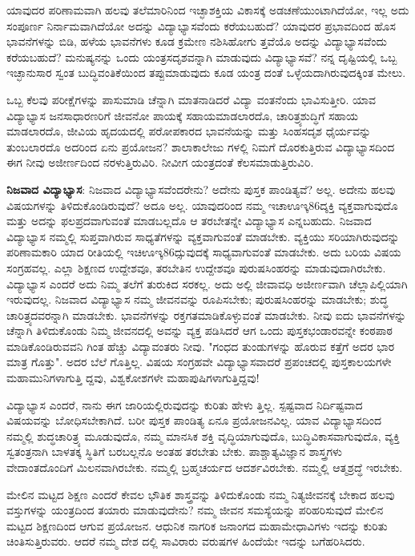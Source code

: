 ಯಾವುದರ ಪರಿಣಾಮವಾಗಿ ಹಲವು ತಲೆಮಾರಿನಿಂದ ಇಚ್ಛಾಶಕ್ತಿಯ ವಿಕಾಸಕ್ಕೆ ಅಡಚಣೆಯುಂಟಾಗಿದೆಯೋ, ಇಲ್ಲ ಅದು ಸಂಪೂರ್ಣ ನಿರ್ನಾಮವಾಗಿದೆಯೋ ಅದನ್ನು ವಿದ್ಯಾಭ್ಯಾಸವೆಂದು ಕರೆಯಬಹುದೆ? ಯಾವುದರ ಪ್ರಭಾವದಿಂದ ಹೊಸ ಭಾವನೆಗಳನ್ನು ಬಿಡಿ, ಹಳೆಯ ಭಾವನೆಗಳು ಕೂಡ ಕ್ರಮೇಣ ನಶಿಸಿಹೋಗು ತ್ತವೆಯೊ ಅದನ್ನು ವಿದ್ಯಾಭ್ಯಾಸವೆಂದು ಕರೆಯಬಹುದೆ? ಮನುಷ್ಯನನ್ನು ಒಂದು ಯಂತ್ರಸದೃಶವನ್ನಾಗಿ ಮಾಡುವುದು ವಿದ್ಯಾಭ್ಯಾಸವೆ? ನನ್ನ ದೃಷ್ಟಿಯಲ್ಲಿ ಒಬ್ಬ ಇಚ್ಛಾನುಸಾರ ಸ್ವಂತ ಬುದ್ಧಿವಂತಿಕೆಯಿಂದ ತಪ್ಪುಮಾಡುವುದು ಕೂಡ ಯಂತ್ರ ದಂತೆ ಒಳ್ಳೆಯದಾಗಿರುವುದಕ್ಕಿಂತ ಮೇಲು.

ಒಬ್ಬ ಕೆಲವು ಪರೀಕ್ಷೆಗಳನ್ನು ಪಾಸುಮಾಡಿ ಚೆನ್ನಾಗಿ ಮಾತನಾಡಿದರೆ ವಿದ್ಯಾ ವಂತನೆಂದು ಭಾವಿಸುತ್ತೀರಿ. ಯಾವ ವಿದ್ಯಾಭ್ಯಾಸ ಜನಸಾಧಾರಣರಿಗೆ ಜೀವನೋ ಪಾಯಕ್ಕೆ ಸಹಾಯಮಾಡಲಾರದೊ, ಚಾರಿತ್ರ್ಯಶುದ್ಧಿಗೆ ಸಹಾಯ ಮಾಡಲಾರದೊ, ಜೀವಿಯ ಹೃದಯದಲ್ಲಿ ಪರೋಪಕಾರದ ಭಾವನೆಯನ್ನು ಮತ್ತು ಸಿಂಹಸದೃಶ ಧೈರ್ಯವನ್ನು ತುಂಬಲಾರದೊ ಅದರಿಂದ ಏನು ಪ್ರಯೋಜನ? ಶಾಲಾಕಾಲೇಜು ಗಳಲ್ಲಿ ನಿಮಗೆ ದೊರಕುತ್ತಿರುವ ವಿದ್ಯಾಭ್ಯಾಸದಿಂದ ಈಗ ನೀವು ಅಜೀರ್ಣದಿಂದ ನರಳುತ್ತಿರುವಿರಿ. ನೀವೀಗ ಯಂತ್ರದಂತೆ ಕೆಲಸಮಾಡುತ್ತಿರುವಿರಿ.

\textbf{ನಿಜವಾದ ವಿದ್ಯಾಭ್ಯಾಸ}: ನಿಜವಾದ ವಿದ್ಯಾಭ್ಯಾಸವೆಂದರೇನು? ಅದೇನು ಪುಸ್ತಕ ಪಾಂಡಿತ್ಯವೆ? ಅಲ್ಲ. ಅದೇನು ಹಲವು ವಿಷಯಗಳನ್ನು ತಿಳಿದುಕೊಂಡಿರುವುದೆ? ಅದೂ ಅಲ್ಲ. ಯಾವುದರಿಂದ ನಮ್ಮ ಇಚಾಊಇ್ಕ86ದ್ಶಕ್ತಿ ವ್ಯಕ್ತವಾಗುವುದೊ ಮತ್ತು ಅದನ್ನು ಫಲಪ್ರದವಾಗುವಂತೆ ಮಾಡಬಲ್ಲದೊ ಆ ತರಬೇತನ್ನೇ ವಿದ್ಯಾಭ್ಯಾಸ ಎನ್ನಬಹುದು. ನಿಜವಾದ ವಿದ್ಯಾಭ್ಯಾಸ ನಮ್ಮಲ್ಲಿ ಸುಪ್ತವಾಗಿರುವ ಸಾಧ್ಯತೆಗಳನ್ನು ವ್ಯಕ್ತವಾಗುವಂತೆ ಮಾಡಬೇಕು. ವ್ಯಕ್ತಿಯು ಸರಿಯಾಗಿರುವುದನ್ನು ಪರಿಣಾಮಕಾರಿ ಯಾದ ರೀತಿಯಲ್ಲಿ ಇಚಿಊಇ್ಕ86ದ್ಸುವುದಕ್ಕೆ ಸಾಧ್ಯವಾಗುವಂತೆ ಮಾಡಬೇಕು. ಅದು ಬರಿಯ ವಿಷಯ ಸಂಗ್ರಹವಲ್ಲ. ಎಲ್ಲಾ ಶಿಕ್ಷಣದ ಉದ್ದೇಶವೂ, ತರಬೇತಿನ ಉದ್ದೇಶವೂ ಪುರುಷಸಿಂಹರನ್ನು ಮಾಡುವುದಾಗಿರಬೇಕು. ವಿದ್ಯಾಭ್ಯಾಸ ಎಂದರೆ ಅದು ನಿಮ್ಮ ತಲೆಗೆ ತುರುಕಿದ ಸರಕಲ್ಲ. ಅದು ಅಲ್ಲಿ ಜೀವಾವಧಿ ಅಜೀರ್ಣವಾಗಿ ಚೆಲ್ಲಾಪಿಲ್ಲಿಯಾಗಿ ಇರುವುದಲ್ಲ. ನಿಜವಾದ ವಿದ್ಯಾಭ್ಯಾಸ ನಮ್ಮ ಜೀವನವನ್ನು ರೂಪಿಸಬೇಕು; ಪುರುಷಸಿಂಹರನ್ನು ಮಾಡಬೇಕು; ಶುದ್ಧ ಚಾರಿತ್ರ್ಯದವರನ್ನಾಗಿ ಮಾಡಬೇಕು. ಭಾವನೆಗಳನ್ನು ರಕ್ತಗತಮಾಡಿಕೊಳ್ಳುವಂತೆ ಮಾಡಬೇಕು. ನೀವು ಐದು ಭಾವನೆಗಳನ್ನು ಚೆನ್ನಾಗಿ ತಿಳಿದುಕೊಂಡು ನಿಮ್ಮ ಜೀವನದಲ್ಲಿ ಅವನ್ನು ವ್ಯಕ್ತ ಪಡಿಸಿದರೆ ಆಗ ಒಂದು ಪುಸ್ತಕಭಂಡಾರವನ್ನೇ ಕಂಠಪಾಠ ಮಾಡಿಕೊಂಡಿರುವವನಿ ಗಿಂತ ಹೆಚ್ಚು ವಿದ್ಯಾವಂತರು ನೀವು. "ಗಂಧದ ತುಂಡುಗಳನ್ನು ಹೊರುವ ಕತ್ತೆಗೆ ಅದರ ಭಾರ ಮಾತ್ರ ಗೊತ್ತು". ಅದರ ಬೆಲೆ ಗೊತ್ತಿಲ್ಲ. ವಿಷಯ ಸಂಗ್ರಹವೇ ವಿದ್ಯಾಭ್ಯಾಸವಾದರೆ ಪ್ರಪಂಚದಲ್ಲಿ ಪುಸ್ತಕಾಲಯಗಳೇ ಮಹಾಮುನಿಗಳಾಗುತ್ತಿ ದ್ದವು, ವಿಶ್ವಕೋಶಗಳೇ ಮಹಾಪುಷಿಗಳಾಗುತ್ತಿದ್ದವು!

ವಿದ್ಯಾಭ್ಯಾಸ ಎಂದರೆ, ನಾನು ಈಗ ಜಾರಿಯಲ್ಲಿರುವುದನ್ನು ಕುರಿತು ಹೇಳು ತ್ತಿಲ್ಲ. ಸ್ಪಷ್ಟವಾದ ನಿರ್ದಿಷ್ಟವಾದ ವಿಷಯವನ್ನು ಬೋಧಿಸಬೇಕಾಗಿದೆ. ಬರೀ ಪುಸ್ತಕ ಪಾಂಡಿತ್ಯ ಏನೂ ಪ್ರಯೋಜನವಿಲ್ಲ. ಯಾವ ವಿದ್ಯಾಭ್ಯಾಸದಿಂದ ನಮ್ಮಲ್ಲಿ ಶುದ್ಧಚಾರಿತ್ರ್ಯ ಮೂಡುವುದೊ, ನಮ್ಮ ಮಾನಸಿಕ ಶಕ್ತಿ ವೃದ್ಧಿಯಾಗುವುದೊ, ಬುದ್ಧಿವಿಕಾಸವಾಗುವುದೊ, ವ್ಯಕ್ತಿ ಸ್ವತಂತ್ರನಾಗಿ ಬಾಳತಕ್ಕ ಸ್ಥಿತಿಗೆ ಬರಬಲ್ಲನೊ ಅಂತಹ ತರಬೇತು ಬೇಕು. ಪಾಶ್ಚಾತ್ಯವಿಜ್ಞಾನ ಶಾಸ್ತ್ರಗಳು ವೇದಾಂತದೊಂದಿಗೆ ಮಿಲನವಾಗಿರಬೇಕು. ನಮ್ಮಲ್ಲಿ ಬ್ರಹ್ಮಚರ್ಯದ ಆದರ್ಶವಿರಬೇಕು. ನಮ್ಮಲ್ಲಿ ಆತ್ಮಶ್ರದ್ಧೆ ಇರಬೇಕು.

ಮೇಲಿನ ಮಟ್ಟದ ಶಿಕ್ಷಣ ಎಂದರೆ ಕೇವಲ ಭೌತಿಕ ಶಾಸ್ತ್ರವನ್ನು ತಿಳಿದುಕೊಂಡು ನಮ್ಮ ನಿತ್ಯಜೀವನಕ್ಕೆ ಬೇಕಾದ ಹಲವು ವಸ್ತುಗಳನ್ನು ಯಂತ್ರದಿಂದ ತಯಾರು ಮಾಡುವುದೇನು? ನಮ್ಮ ಜೀವನ ಸಮಸ್ಯೆಯನ್ನು ಪರಿಹರಿಸುವುದೆ ಮೇಲಿನ ಮಟ್ಟದ ಶಿಕ್ಷಣದಿಂದ ಆಗುವ ಪ್ರಯೋಜನ. ಆಧುನಿಕ ನಾಗರಿಕ ಜನಾಂಗದ ಮಹಾಮೇಧಾವಿಗಳು ಇದನ್ನು ಕುರಿತು ಚಿಂತಿಸುತ್ತಿರುವರು. ಆದರೆ ನಮ್ಮ ದೇಶ ದಲ್ಲಿ ಸಾವಿರಾರು ವರುಷಗಳ ಹಿಂದೆಯೇ ಇದನ್ನು ಬಗೆಹರಿಸಿದರು.

